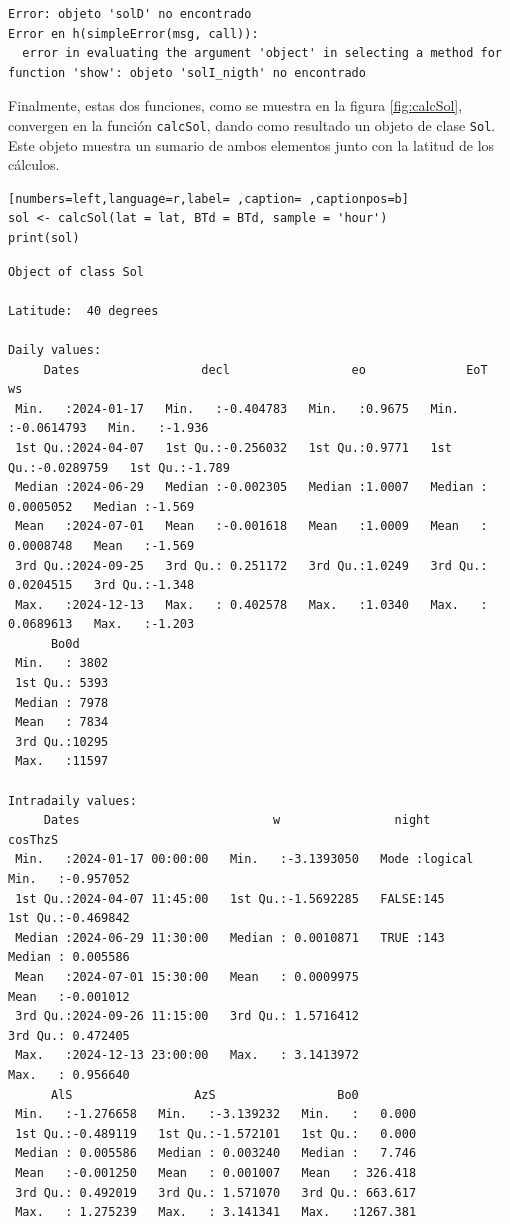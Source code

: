 \begin{verbatim}
Error: objeto 'solD' no encontrado
Error en h(simpleError(msg, call)): 
  error in evaluating the argument 'object' in selecting a method for function 'show': objeto 'solI_nigth' no encontrado
\end{verbatim}


Finalmente, estas dos funciones, como se muestra en la figura \ref{fig:calcSol}, convergen en la función \texttt{calcSol}, dando como resultado un objeto de clase \texttt{Sol}. Este objeto muestra un sumario de ambos elementos junto con la latitud de los cálculos.
\begin{lstlisting}[numbers=left,language=r,label= ,caption= ,captionpos=b]
sol <- calcSol(lat = lat, BTd = BTd, sample = 'hour')
print(sol)
\end{lstlisting}

\begin{verbatim}
Object of class Sol 

Latitude:  40 degrees

Daily values:
     Dates                 decl                 eo              EoT                   ws        
 Min.   :2024-01-17   Min.   :-0.404783   Min.   :0.9675   Min.   :-0.0614793   Min.   :-1.936  
 1st Qu.:2024-04-07   1st Qu.:-0.256032   1st Qu.:0.9771   1st Qu.:-0.0289759   1st Qu.:-1.789  
 Median :2024-06-29   Median :-0.002305   Median :1.0007   Median : 0.0005052   Median :-1.569  
 Mean   :2024-07-01   Mean   :-0.001618   Mean   :1.0009   Mean   : 0.0008748   Mean   :-1.569  
 3rd Qu.:2024-09-25   3rd Qu.: 0.251172   3rd Qu.:1.0249   3rd Qu.: 0.0204515   3rd Qu.:-1.348  
 Max.   :2024-12-13   Max.   : 0.402578   Max.   :1.0340   Max.   : 0.0689613   Max.   :-1.203  
      Bo0d      
 Min.   : 3802  
 1st Qu.: 5393  
 Median : 7978  
 Mean   : 7834  
 3rd Qu.:10295  
 Max.   :11597  

Intradaily values: 
     Dates                           w                night            cosThzS         
 Min.   :2024-01-17 00:00:00   Min.   :-3.1393050   Mode :logical   Min.   :-0.957052  
 1st Qu.:2024-04-07 11:45:00   1st Qu.:-1.5692285   FALSE:145       1st Qu.:-0.469842  
 Median :2024-06-29 11:30:00   Median : 0.0010871   TRUE :143       Median : 0.005586  
 Mean   :2024-07-01 15:30:00   Mean   : 0.0009975                   Mean   :-0.001012  
 3rd Qu.:2024-09-26 11:15:00   3rd Qu.: 1.5716412                   3rd Qu.: 0.472405  
 Max.   :2024-12-13 23:00:00   Max.   : 3.1413972                   Max.   : 0.956640  
      AlS                 AzS                 Bo0          
 Min.   :-1.276658   Min.   :-3.139232   Min.   :   0.000  
 1st Qu.:-0.489119   1st Qu.:-1.572101   1st Qu.:   0.000  
 Median : 0.005586   Median : 0.003240   Median :   7.746  
 Mean   :-0.001250   Mean   : 0.001007   Mean   : 326.418  
 3rd Qu.: 0.492019   3rd Qu.: 1.571070   3rd Qu.: 663.617  
 Max.   : 1.275239   Max.   : 3.141341   Max.   :1267.381
\end{verbatim}

